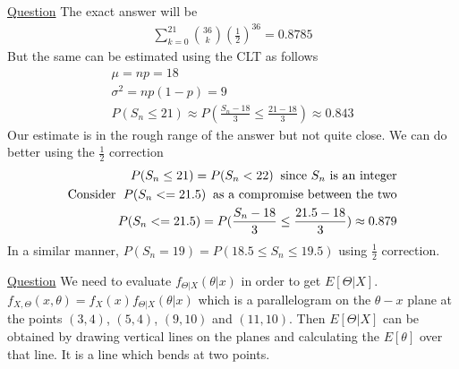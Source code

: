 \documentclass[11pt, a4paper]{article}
\begin{document}
\begin{enumerate}
        \hypertarget{a_binclt}{\item} \hyperlink{q_binclt}{Question}
        The exact answer will be
        \begin{align*}
            \sum_{k=0}^{21}\binom{36}{k}(\frac{1}{2})^{36} = 0.8785
        \end{align*}
        But the same can be estimated using the CLT as follows
        \begin{align*}
            \mu = np = 18\\
            \sigma^{2} = np(1-p) = 9\\
            P(S_{n} \leq 21) \approx P(\frac{S_{n} - 18}{3} \leq \frac{21-18}{3}) \approx 0.843
        \end{align*}
        Our estimate is in the rough range of the answer but not quite close. We can do better using the $\frac{1}{2}$ correction
        \begin{align*}
            P(S_{n} \leq 21) = P(S_{n} < 22) \text{\;\;since $S_{n}$ is an integer}\\
            \text{Consider \;}P(S_{n} <= 21.5) \text{\;\;as a compromise between the two}\\
            P(S_{n} <= 21.5) = P(\frac{S_{n} - 18}{3} \leq \frac{21.5 - 18}{3}) \approx 0.879
        \end{align*}
        In a similar manner, $P(S_{n}=19) = P(18.5 \leq S_{n} \leq 19.5)$ using $\frac{1}{2}$ correction.


        \hypertarget{a_lmsestimate}{\item} \hyperlink{q_lmsestimate}{Question}\newline
        We need to evaluate $f_{\Theta|X}(\theta|x)$ in order to get $E[\Theta|X]$.
        \newline
        $f_{X,\Theta}(x,\theta) = f_{X}(x) f_{\Theta|X}(\theta|x)$ which is a parallelogram on the $\theta-x$ plane at the points  $(3,4)$, $(5,4)$, $(9,10)$ and $(11,10)$. Then $E[\Theta|X]$ can be obtained by drawing vertical lines on the planes and calculating the $E[\theta]$ over that line. It is a line which bends at two points.


\end{enumerate}
\end{document}
